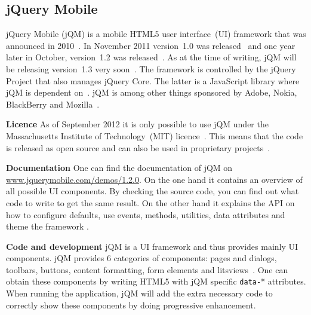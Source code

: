 \documentclass[a4paper]{artikel3}
\newcommand{\code}[1]{\texttt{#1}}
\renewcommand{\url}[1]{\href{http://#1}{#1}}
\renewcommand{\paragraph}[1]{{\bf #1} }
\begin{document}
\subsection{jQuery Mobile} %
\label{sec:jqm}

jQuery Mobile (jQM) is a mobile HTML5 user interface~(UI) framework that was announced in 2010~\cite{Resig2010}. 
In November 2011 version~1.0 was released~\cite{Parker2011} and one year later in October, version~1.2 was released~\cite{Parker2012}. 
As at the time of writing, jQM will be releasing version~1.3 very soon~\cite{Parker2013}.
The framework is controlled by the jQuery Project that also manages jQuery Core. 
The latter is a JavaScript library where jQM is dependent on~\cite{JQuery2012}. 
jQM is among other things sponsored by Adobe, Nokia, BlackBerry and Mozilla~\cite{JQuery2012a}.

\paragraph{Licence}
As of September 2012 it is only possible to use jQM under the Massachusetts Institute of Technology~(MIT) licence~\cite{Dmethvin2012}. 
This means that the code is released as open source and can also be used in proprietary projects~\cite{PhilDutson2012}.

\paragraph{Documentation}
One can find the documentation of jQM on \url{www.jquerymobile.com/demos/1.2.0}. On the one hand it contains an overview of all possible UI components. 
By checking the source code, you can find out what code to write to get the same result. 
On the other hand it explains the API on how to configure defaults, use events, methods, utilities, data attributes and theme the framework \cite{JQuery2012b}.

\paragraph{Code and development}
jQM is a UI framework and thus provides mainly UI components. 
jQM provides 6 categories of components: pages and dialogs, toolbars, buttons, content formatting, form elements and litsviews~\cite{JQuery2012b}. 
One can obtain these components by writing HTML5 with jQM specific \code{data-}* attributes. 
When running the application, jQM will add the extra necessary code to correctly show these components by doing progressive enhancement.
\end{document}

